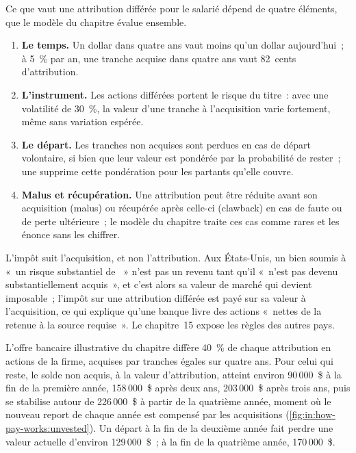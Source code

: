 Ce que vaut une attribution différée pour le salarié dépend de quatre éléments, que le modèle du chapitre évalue ensemble.
\begin{enumerate}
\item \textbf{Le temps.} Un dollar dans quatre ans vaut moins qu'un dollar aujourd'hui~; à 5~\% par an, une tranche acquise dans quatre
ans vaut 82~cents d'attribution.
\item \textbf{L'instrument.} Les actions différées portent le risque du titre~: avec une volatilité de 30~\%, la valeur d'une tranche à
l'acquisition varie fortement, même sans variation espérée.
\item \textbf{Le départ.} Les tranches non acquises sont perdues en cas de départ volontaire, si bien que leur valeur est pondérée par la
probabilité de rester~; une  supprime cette pondération pour les partants qu'elle couvre.
\item \textbf{Malus et récupération.} Une attribution peut être réduite avant son acquisition (malus) ou récupérée après celle-ci (clawback) en cas de
faute ou de perte ultérieure~; le modèle du chapitre traite ces cas comme rares et les énonce sans les chiffrer.
\end{enumerate}
L'impôt suit l'acquisition, et non l'attribution. Aux États-Unis, un bien soumis à «~un risque substantiel de ~»
n'est pas un revenu tant qu'il «~n'est pas devenu substantiellement acquis~», et c'est alors sa valeur de marché qui devient imposable~; l'impôt sur une attribution différée est payé
sur sa valeur à l'acquisition, ce qui explique qu'une banque livre des actions «~nettes de la retenue à la source requise~». Le chapitre~15 expose les
règles des autres pays.

\begin{example}[La menotte]\label{ex:in:how-pay-works:handcuff}
L'offre bancaire illustrative du chapitre diffère 40~\% de chaque attribution en actions de la firme, acquises par tranches égales sur
quatre ans. Pour celui qui reste, le solde non acquis, à la valeur d'attribution, atteint environ 90\,000~\$ à la fin de la première
année, 158\,000~\$ après deux ans, 203\,000~\$ après trois ans, puis se stabilise autour de 226\,000~\$ à partir de la quatrième année, moment où le nouveau
report de chaque année est compensé par les acquisitions (\cref{fig:in:how-pay-works:unvested}). Un départ à la fin de la deuxième année fait perdre une valeur actuelle
d'environ 129\,000~\$~; à la fin de la quatrième année, 170\,000~\$.
\end{example}

